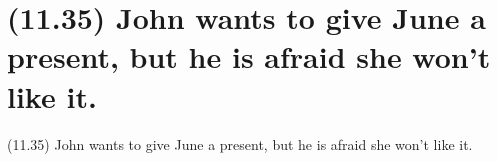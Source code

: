 \documentclass{article}
\begin{document}
\clearpage

%
%

\section*{(11.35) John wants to give June a present, but he is afraid she won’t like it.}

\bigbreak
\begin{enumerate*}
\item[(11.35)] John wants to give June a present, but he is afraid she won’t like it.
\end{enumerate*}
\bigbreak
\end{document}
